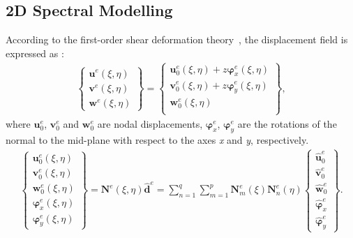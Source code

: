 \documentclass[sensors,article,accept,moreauthors,pdftex]{Definitions/mdpi}
\begin{document}
\subsection{2D Spectral Modelling}
\label{sec:2D_SEM}

According to the first-order shear deformation theory~\cite{reissner1945effect, mindlin1951influence}, the displacement field is expressed as%
:
\begin{eqnarray}
\left \{ \begin{array}{c}
\textbf{u}^e(\xi,\eta) \\
\textbf{v}^e(\xi,\eta) \\
\textbf{w}^e(\xi,\eta)
\end{array} \right\} = 
\left \{ \begin{array}{c}
\textbf{u}_0^e(\xi,\eta) + z\boldsymbol{\varphi}_x^e(\xi,\eta)\\
\textbf{v}_0^e(\xi,\eta) + z\boldsymbol{\varphi}_y^e(\xi,\eta)\\
\textbf{w}_0^e(\xi,\eta) \\
\end{array} \right\},
\end{eqnarray}
where \(\textbf{u}_0^e\), \(\textbf{v}_0^e\) and \(\textbf{w}_0^e\) are nodal displacements, \(\boldsymbol{\varphi}_x^e\), \(\boldsymbol{\varphi}_y^e\) are the rotations of the normal to the mid-plane with respect to the axes \textit{x} and \textit{y}, respectively.
\begin{eqnarray}
\left \{\begin{array}{c}
\textbf{u}_0^e(\xi,\eta) \\
\textbf{v}_0^e(\xi,\eta) \\
\textbf{w}_0^e(\xi,\eta) \\
\boldsymbol{\varphi}_x^e(\xi,\eta) \\
\boldsymbol{\varphi}_y^e(\xi,\eta)
\end{array} \right\}
= \textbf{N}^e(\xi,\eta)\widehat{\textbf{d}}^e
= \sum_{n=1}^q\sum_{m=1}^p\textbf{N}_m^e(\xi)\textbf{N}_n^e(\eta)
\left \{ \begin{array}{c}
\widehat{\textbf{u}}_0^e \\
\widehat{\textbf{v}}_0^e \\
\widehat{\textbf{w}}_0^e \\
\widehat{\boldsymbol{\varphi}}_x^e \\
\widehat{\boldsymbol{\varphi}}_y^e
\end{array} \right \}.
\end{eqnarray}
\end{document}
